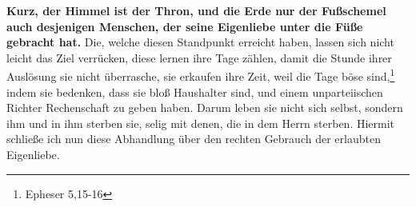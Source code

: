 \medskip

\textbf{Kurz, der Himmel ist der Thron, und die Erde nur der Fußschemel auch
desjenigen
Menschen, der seine Eigenliebe unter die Füße gebracht hat.} Die, welche diesen
Standpunkt erreicht haben, lassen sich nicht leicht das Ziel verrücken, diese
lernen ihre Tage zählen, damit die Stunde ihrer Auslösung sie nicht überrasche,
sie erkaufen ihre Zeit, weil die Tage böse sind,\footnote{Epheser 5,15-16}
indem
sie bedenken, dass sie bloß Haushalter sind, und einem unparteiischen Richter
Rechenschaft zu geben haben. Darum leben sie nicht sich selbst, sondern ihm und
in ihm sterben sie, selig mit denen, die in dem Herrn sterben. Hiermit schließe
ich nun diese Abhandlung über den rechten Gebrauch der erlaubten Eigenliebe.







